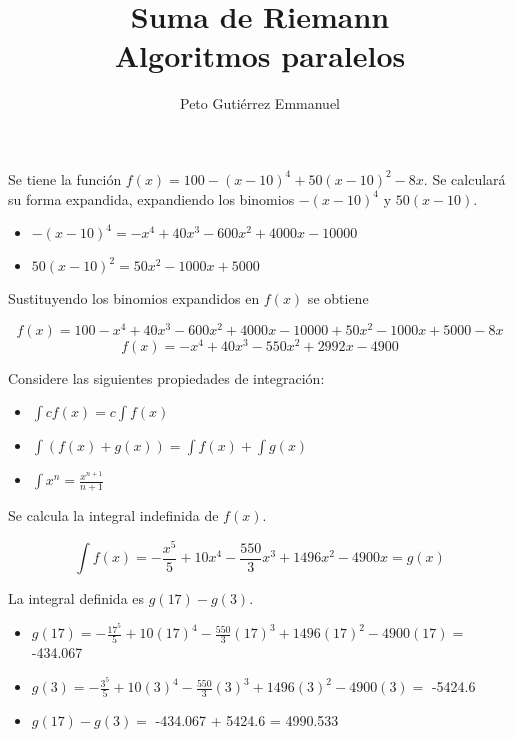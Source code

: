 \documentclass{article}
\title{Suma de Riemann\\Algoritmos paralelos}
\author{Peto Gutiérrez Emmanuel}
\begin{document}
\maketitle

Se tiene la función $f(x) = 100 - (x-10)^4 + 50(x-10)^2 - 8x$. Se calculará su forma expandida, expandiendo los binomios $-(x-10)^4$ y $50(x-10)$.

\begin{itemize}
\item $-(x-10)^4 = -x^4 + 40x^3 - 600x^2 + 4000x - 10000$
\item $50(x-10)^2 = 50x^2 - 1000x + 5000$
\end{itemize}

Sustituyendo los binomios expandidos en $f(x)$ se obtiene

\[f(x) = 100 - x^4 + 40x^3 - 600x^2 + 4000x - 10000 + 50x^2 - 1000x + 5000 - 8x\]
\[f(x) = -x^4 + 40x^3 -550x^2 + 2992x - 4900\]

Considere las siguientes propiedades de integración:
\begin{itemize}
\item $\int cf(x) = c \int f(x)$
\item $\int (f(x) + g(x)) = \int f(x) + \int g(x)$
\item $\int x^n = \frac{x^{n+1}}{n+1}$
\end{itemize}

Se calcula la integral indefinida de $f(x)$.

$$\int f(x) = -\frac{x^5}{5} + 10x^4 - \frac{550}{3}x^3 + 1496x^2 - 4900x = g(x)$$

La integral definida es $g(17) - g(3)$.

\begin{itemize}
\item $g(17) = -\frac{17^5}{5} + 10(17)^4 - \frac{550}{3}(17)^3 + 1496(17)^2 - 4900(17) =$ -434.067

\item $g(3) = -\frac{3^5}{5} + 10(3)^4 - \frac{550}{3}(3)^3 + 1496(3)^2 - 4900(3) =$ -5424.6

\item $g(17) - g(3) =$ -434.067 + 5424.6 = 4990.533
\end{itemize}
\end{document}
